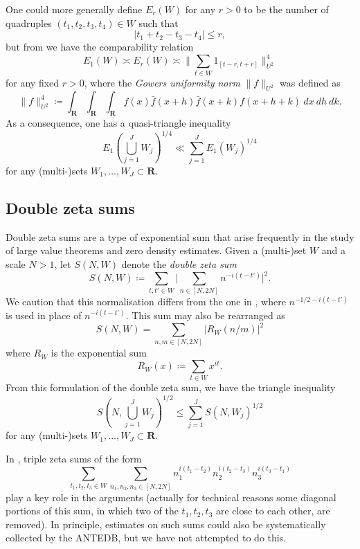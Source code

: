\documentclass[a4paper, 10pt]{amsart}
\newcommand{\R}{\mathbf{R}}
\begin{document}
One could more generally define $E_r(W)$ for any $r>0$ to be the number of quadruples $(t_1,t_2,t_3,t_4) \in W$ such that
$$    |t_1 + t_2 - t_3 - t_4| \leq r,$$
but from \cite[Lemma 3.1]{cladek-tao} we have the comparability relation
\begin{equation}\label{energy-asymp}
    E_1(W) \asymp E_r(W) \asymp \bigg\| \sum_{t \in W} 1_{[t-r,t+r]} \bigg\|_{U^2}^4
\end{equation}
for any fixed $r>0$, where the \emph{Gowers uniformity norm} $\|f\|_{U^2}$ was defined as
$$\|f\|_{U^2}^4 \coloneqq \int_\R \int_\R \int_\R f(x) \bar{f}(x+h) \bar{f}(x+k) f(x+h+k)\ dx\ dh\ dk.$$
As a consequence, one has a quasi-triangle inequality
\begin{equation}\label{energy-triangle}
    E_1\left(\bigcup_{j=1}^J W_j\right)^{1/4} \ll \sum_{j=1}^J E_1(W_j)^{1/4}
\end{equation}
for any (multi-)sets $W_1,\dots,W_J \subset \R$.

\subsection{Double zeta sums}

Double zeta sums are a type of exponential sum that arise frequently in the study of large value theorems and zero density estimates.
Given a (multi-)set $W$ and a scale $N>1$, let $S(N,W)$ denote the \emph{double zeta sum}
\begin{equation*}\label{snw-def}
     S(N,W) \coloneqq \sum_{t,t' \in W} \bigg|\sum_{n \in [N,2N]} n^{-i(t-t')} \bigg|^2.
\end{equation*}
We caution that this normalisation differs from the one in \cite{ivic}, where $n^{-1/2-i(t-t')}$ is used in place of $n^{-i(t-t')}$.  This sum may also be rearranged as
\begin{equation}\label{snw}
 S(N,W) = \sum_{n,m \in [N,2N]} |R_W(n/m)|^2
\end{equation}
where $R_W$ is the exponential sum
$$ R_W(x) \coloneqq \sum_{t \in W} x^{it}.$$
From this formulation of the double zeta sum, we have the triangle inequality
\begin{equation*}\label{snw-triangle}
    S\left(N,\bigcup_{j=1}^J W_j\right)^{1/2} \leq \sum_{j=1}^J S(N,W_j)^{1/2}
\end{equation*}
for any (multi-)sets $W_1,\dots,W_J \subset \R$.

\begin{remark} In \cite[Section 2]{guth-maynard}, triple zeta sums of the form
$$ \sum_{t_1,t_2,t_3 \in W} \sum_{n_1,n_2,n_3 \in [N,2N]} n_1^{i(t_1-t_2)} n_2^{i(t_2-t_3)} n_3^{i(t_3-t_1)}$$
play a key role in the arguments (actually for technical reasons some diagonal portions of this sum, in which two of the $t_1,t_2,t_3$ are close to each other, are removed).  In principle, estimates on such sums could also be systematically collected by the ANTEDB, but we have not attempted to do this.
\end{remark}
\end{document}
